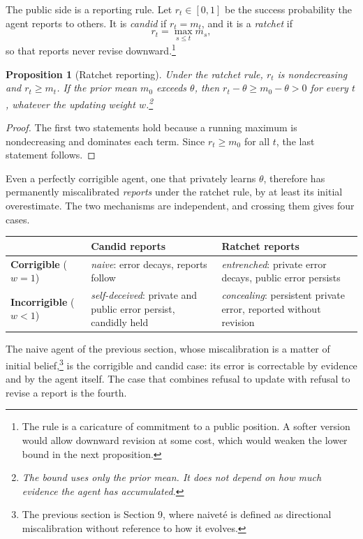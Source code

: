 \documentclass[11pt]{article}
\newtheorem{proposition}{Proposition}
\theoremstyle{remark}
\begin{document}
The public side is a reporting rule. Let $r_t\in[0,1]$ be the success probability the agent reports to others. It is \emph{candid} if $r_t=m_t$, and it is a \emph{ratchet} if
\[
r_t=\max_{s\le t}m_s,
\]
so that reports never revise downward.\footnote{The rule is a caricature of commitment to a public position. A softer version would allow downward revision at some cost, which would weaken the lower bound in the next proposition.}

\begin{proposition}[Ratchet reporting]
Under the ratchet rule, $r_t$ is nondecreasing and $r_t\ge m_t$. If the prior mean $m_0$ exceeds $\theta$, then $r_t-\theta\ge m_0-\theta>0$ for every $t$, whatever the updating weight $w$.\footnote{The bound uses only the prior mean. It does not depend on how much evidence the agent has accumulated.}
\end{proposition}

\begin{proof}
The first two statements hold because a running maximum is nondecreasing and dominates each term. Since $r_t\ge m_0$ for all $t$, the last statement follows.
\end{proof}

Even a perfectly corrigible agent, one that privately learns $\theta$, therefore has permanently miscalibrated \emph{reports} under the ratchet rule, by at least its initial overestimate. The two mechanisms are independent, and crossing them gives four cases.

\begin{center}
\renewcommand{\arraystretch}{1.3}
\begin{tabular}{@{}p{2.8cm}p{5.3cm}p{5.3cm}@{}}
\hline
 & \textbf{Candid reports} & \textbf{Ratchet reports}\\
\hline
\textbf{Corrigible} ($w=1$) & \emph{naive}: error decays, reports follow & \emph{entrenched}: private error decays, public error persists\\
\textbf{Incorrigible} ($w<1$) & \emph{self-deceived}: private and public error persist, candidly held & \emph{concealing}: persistent private error, reported without revision\\
\hline
\end{tabular}
\end{center}

The naive agent of the previous section, whose miscalibration is a matter of initial belief,\footnote{The previous section is Section 9, where naivet\'e is defined as directional miscalibration without reference to how it evolves.} is the corrigible and candid case: its error is correctable by evidence and by the agent itself. The case that combines refusal to update with refusal to revise a report is the fourth.
\end{document}
